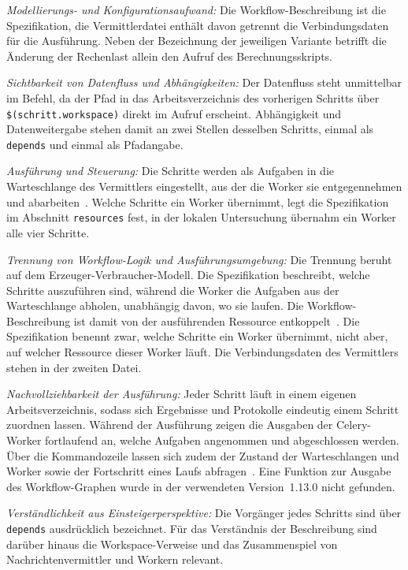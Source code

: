 \emph{Modellierungs- und Konfigurationsaufwand:} Die
Workflow-Beschreibung ist die Spezifikation, die Vermittlerdatei
enthält davon getrennt die Verbindungsdaten für die Ausführung. Neben der Bezeichnung der jeweiligen Variante betrifft die Änderung
der Rechenlast allein den Aufruf des Berechnungsskripts.

\emph{Sichtbarkeit von Datenfluss und Abhängigkeiten:} Der Datenfluss
steht unmittelbar im Befehl, da der Pfad in das Arbeitsverzeichnis
des vorherigen Schritts über \texttt{\$(schritt.workspace)} direkt im
Aufruf erscheint. Abhängigkeit und Datenweitergabe stehen damit an
zwei Stellen desselben Schritts, einmal als \texttt{depends} und
einmal als Pfadangabe.

\emph{Ausführung und Steuerung:} Die Schritte werden als Aufgaben in die Warteschlange des Vermittlers eingestellt, aus der die Worker
sie entgegennehmen und abarbeiten~\cite[S.~258]{peterson2022merlin}\cite{merlindocs-celery}. Welche Schritte ein
Worker übernimmt, legt die Spezifikation im Abschnitt
\texttt{resources} fest, in der lokalen Untersuchung übernahm ein
Worker alle vier Schritte.

\emph{Trennung von Workflow-Logik und Ausführungsumgebung:} Die
Trennung beruht auf dem Erzeuger-Verbraucher-Modell. Die
Spezifikation beschreibt, welche Schritte auszuführen sind, während
die Worker die Aufgaben aus der Warteschlange abholen, unabhängig
davon, wo sie laufen. Die Workflow-Beschreibung ist damit von der
ausführenden Ressource entkoppelt~\cite[S.~261]{peterson2022merlin}. Die
Spezifikation benennt zwar, welche Schritte ein Worker übernimmt,
nicht aber, auf welcher Ressource dieser Worker läuft. Die
Verbindungsdaten des Vermittlers stehen in der zweiten Datei.


\emph{Nachvollziehbarkeit der Ausführung:} Jeder Schritt läuft in
einem eigenen Arbeitsverzeichnis, sodass sich Ergebnisse und
Protokolle eindeutig einem Schritt zuordnen lassen. Während der
Ausführung zeigen die Ausgaben der Celery-Worker fortlaufend an,
welche Aufgaben angenommen und abgeschlossen werden. Über die
Kommandozeile lassen sich zudem der Zustand der Warteschlangen und
Worker sowie der Fortschritt eines Laufs abfragen~\cite{merlindocs-commands}.
Eine Funktion zur Ausgabe des Workflow-Graphen wurde in der
verwendeten Version~1.13.0 nicht gefunden.

\emph{Verständlichkeit aus Einsteigerperspektive:} Die Vorgänger
jedes Schritts sind über \texttt{depends} ausdrücklich bezeichnet.
Für das Verständnis der Beschreibung sind darüber hinaus die
Workspace-Verweise und das Zusammenspiel von Nachrichtenvermittler
und Workern relevant.

